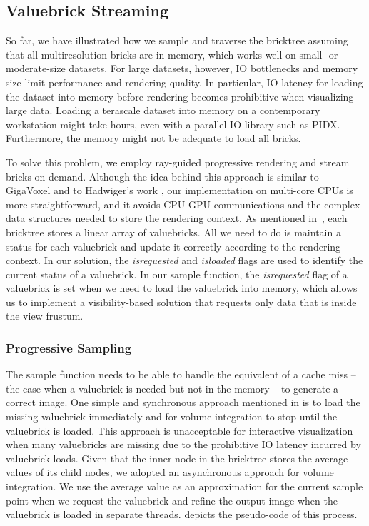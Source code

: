 \subsection{Valuebrick Streaming}
So far, we have illustrated how we sample and traverse the bricktree assuming that all
multiresolution bricks are in memory, which works well on small- or moderate-size datasets. 
For large datasets, however, IO bottlenecks and memory size limit performance and rendering
quality. In particular, IO latency for loading the dataset into memory before
rendering becomes prohibitive when visualizing large data. Loading a
terascale dataset into memory on a contemporary workstation might take hours, even with a parallel IO
library such as PIDX. Furthermore, the memory might not be adequate to load all bricks. 


To solve this problem, we employ ray-guided progressive rendering and stream bricks
on demand. Although the idea behind this approach is similar to GigaVoxel\cite{crassin2009gigavoxels}
and to Hadwiger's work \cite{hadwiger2012interactive}, our implementation on multi-core CPUs
is more straightforward, and it avoids CPU-GPU communications and the complex data structures
needed to store the rendering context. As mentioned in~,
each bricktree stores a linear array of valuebricks. All we need to do is maintain a
status for each valuebrick and update it correctly according to the rendering context.
In our solution, the \textit{isrequested} and \textit{isloaded} flags are
used to identify the current status of a valuebrick. In our sample function, 
the \textit{isrequested} flag of a valuebrick is set when we need to load the valuebrick
into memory, which allows us to implement a visibility-based solution that requests only
data that is inside the view frustum. 


\subsubsection{Progressive Sampling}
The sample function needs to be able to handle the equivalent of a cache miss -- the case
when a valuebrick is needed but not in the memory -- to generate a correct image.
One simple and synchronous approach mentioned in \cite{crassin2009gigavoxels} is to
load the missing valuebrick immediately and for volume integration to stop until 
the valuebrick is loaded. 
This approach is unacceptable for interactive visualization when many valuebricks are missing 
due to the prohibitive IO latency incurred by valuebrick loads. Given that the inner node
in the bricktree stores the average values of its child nodes, we adopted an
asynchronous approach for volume integration. We use the average value as an
approximation for the current sample point when we request the valuebrick and
refine the output image when the valuebrick is loaded in separate threads. 
 depicts the pseudo-code of this process. 



